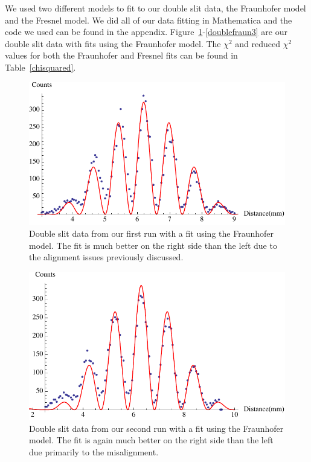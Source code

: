 \documentclass[prb,preprint]{revtex4-1}
\begin{document}
We used two different models to fit to our double slit data, the Fraunhofer model and the Fresnel model. We did all of our data fitting in Mathematica and the code we used can be found in the appendix. Figure~\ref{doublefraun1}-\ref{doublefraun3} are our double slit data with fits using the Fraunhofer model. The $\chi^2$ and reduced $\chi^2$ values for both the Fraunhofer and Fresnel fits can be found in Table~\ref{chisquared}.

\begin{figure}[h!]
\centering
\includegraphics[width=6in]{doublefraun1.pdf}
\caption{Double slit data from our first run with a fit using the Fraunhofer model. The fit is much better on the right side than the left due to the alignment issues previously discussed.}
\label{doublefraun1}
\end{figure}

\begin{figure}[h!]
\centering
\includegraphics[width=6in]{doublefraun2.pdf}
\caption{Double slit data from our second run with a fit using the Fraunhofer model. The fit is again much better on the right side than the left due primarily to the misalignment.}
\label{doublefraun2}
\end{figure}
\end{document}
